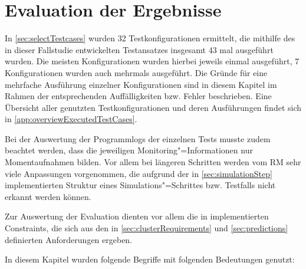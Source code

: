 \chapter{Evaluation der Ergebnisse}
\label{chap:evaluationResults}

In \autoref{sec:selectTestcases} wurden 32 Testkonfigurationen ermittelt, die mithilfe des in dieser Fallstudie entwickelten Testansatzes insgesamt 43 mal ausgeführt wurden.
Die meisten Konfigurationen wurden hierbei jeweils einmal ausgeführt, 7 Konfigurationen wurden auch mehrmals ausgeführt.
Die Gründe für eine mehrfache Ausführung einzelner Konfigurationen sind in diesem Kapitel im Rahmen der entsprechenden Auffälligkeiten bzw. Fehler beschrieben.
Eine Übersicht aller genutzten Testkonfigurationen und deren Ausführungen findet sich in \autoref{app:overviewExecutedTestCases}.

Bei der Auswertung der Programmlogs der einzelnen Tests musste zudem beachtet werden, dass die jeweiligen Monitoring"=Informationen nur Momentaufnahmen bilden.
Vor allem bei längeren Schritten werden vom \ac{RM} sehr viele Anpassungen vorgenommen, die aufgrund der in \autoref{sec:simulationStep} implementierten Struktur eines Simulations"=Schrittes bzw. Testfalls nicht erkannt werden können.

Zur Auswertung der Evaluation dienten vor allem die in  implementierten Constraints, die sich aus den in \autoref{sec:clusterRequirements} und \autoref{sec:predictions} definierten Anforderungen ergeben.

In diesem Kapitel wurden folgende Begriffe mit folgenden Bedeutungen genutzt:

